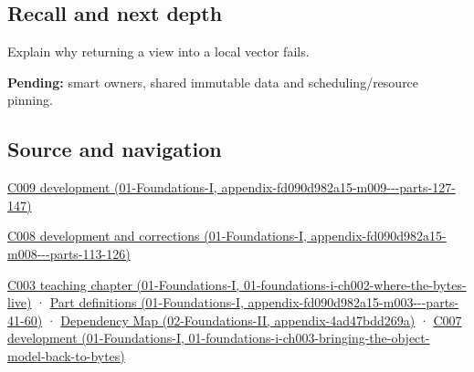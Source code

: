 \subsection{Recall and next depth}\label{appendix-d52e4486f527-recall-and-next-depth}

Explain why returning a view into a local vector fails.

\textbf{Pending:} smart owners, shared immutable data and scheduling/resource pinning.

\subsection{Source and navigation}\label{appendix-d52e4486f527-source-and-navigation}

\href{../01-Foundations-I/main.pdf\#nameddest=appendix-fd090d982a15-m009---parts-127-147}{C009 development (01-Foundations-I, appendix-fd090d982a15-m009-\/-\/-parts-127-147)}

\href{../01-Foundations-I/main.pdf\#nameddest=appendix-fd090d982a15-m008---parts-113-126}{C008 development and corrections (01-Foundations-I, appendix-fd090d982a15-m008-\/-\/-parts-113-126)}

\href{../01-Foundations-I/main.pdf\#nameddest=01-foundations-i-ch002-where-the-bytes-live}{C003 teaching chapter (01-Foundations-I, 01-foundations-i-ch002-where-the-bytes-live)} · \href{../01-Foundations-I/main.pdf\#nameddest=appendix-fd090d982a15-m003---parts-41-60}{Part definitions (01-Foundations-I, appendix-fd090d982a15-m003-\/-\/-parts-41-60)} · \href{../02-Foundations-II/main.pdf\#nameddest=appendix-4ad47bdd269a}{Dependency Map (02-Foundations-II, appendix-4ad47bdd269a)} · \href{../01-Foundations-I/main.pdf\#nameddest=01-foundations-i-ch003-bringing-the-object-model-back-to-bytes}{C007 development (01-Foundations-I, 01-foundations-i-ch003-bringing-the-object-model-back-to-bytes)}
